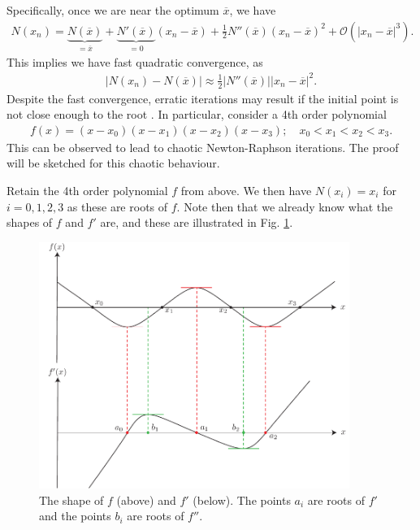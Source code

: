 \begin{ex}
Specifically, once we are near the optimum $\overline{x}$, we have
\begin{align}
	N(x_n) = \underbrace{N(\overline{x})}_{=\overline{x}} + \underbrace{N'(\overline{x})}_{=0}(x_n - \overline{x}) + \frac{1}{2} N''(\overline{x})(x_n - \overline{x})^{2} + \mathcal{O}\left( | x_n - \overline{x}|^{3}\right).
\end{align}
This implies we have fast quadratic convergence, as
\begin{align}
	\left| N(x_n) - N(\overline{x}) \right| \approx \frac{1}{2} | N''(\overline{x})| |x_{n} - \overline{x}|^{2}.
\end{align}
Despite the fast convergence, erratic iterations may result if the initial point is not close enough to the root \cite{SaariUrenko}. In particular, consider a 4th order polynomial 
\begin{align}
	f(x) = (x-x_0)(x-x_1)(x-x_2)(x-x_3);\quad x_0<x_1<x_2<x_3.
\end{align}
This can be observed to lead to chaotic Newton-Raphson iterations. The proof will be sketched for this chaotic behaviour.

Retain the 4th order polynomial $f$ from above. We then have $N(x_i)=x_i$ for $i=0,1,2,3$ as these are roots of $f$. Note then that we already know what the shapes of $f$ and $f'$ are, and these are illustrated in Fig. \ref{fig:NR_pf1}.
\begin{figure}[h!]
	\centering
	\includegraphics[width=0.9\textwidth]{figures/ch7/2NR_pf1.pdf}
	\caption{The shape of $f$ (above) and $f'$ (below). The points $a_i$ are roots of $f'$ and the points $b_{i}$ are roots of $f''$.}
	\label{fig:NR_pf1}
\end{figure}


\end{ex}
